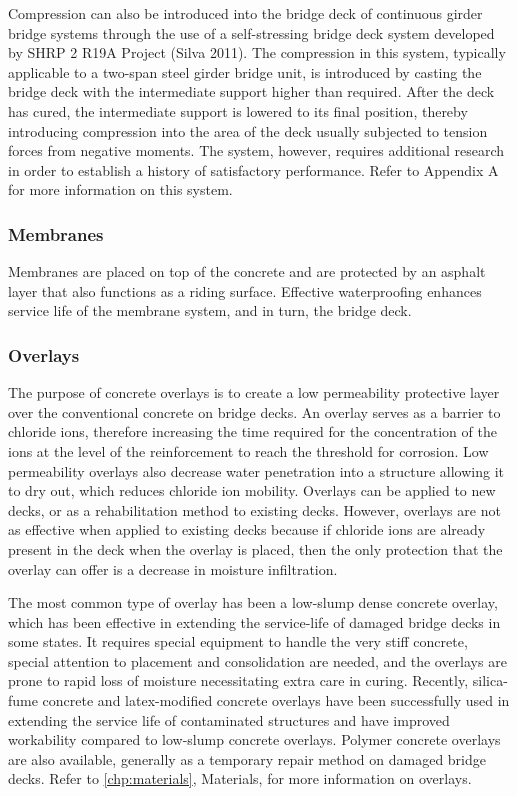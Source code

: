 Compression can also be introduced into the bridge deck of continuous girder bridge systems through the use of a
self-stressing bridge deck system developed by SHRP 2 R19A Project (Silva 2011). The compression in this system,
typically applicable to a two-span steel girder bridge unit, is introduced by casting the bridge deck with the
intermediate support higher than required. After the deck has cured, the intermediate support is lowered to its final
position, thereby introducing compression into the area of the deck usually subjected to tension forces from negative
moments. The system, however, requires additional research in order to establish a history of satisfactory
performance. Refer to Appendix A for more information on this system.

\subsubsection{Membranes}
Membranes are placed on top of the concrete and are protected by an asphalt layer that also functions as a riding
surface. Effective waterproofing enhances service life of the membrane system, and in turn, the bridge deck.

\subsubsection{Overlays}
The purpose of concrete overlays is to create a low permeability protective layer over the conventional concrete
on bridge decks. An overlay serves as a barrier to chloride ions, therefore increasing the time required for the
concentration of the ions at the level of the reinforcement to reach the threshold for corrosion. Low permeability
overlays also decrease water penetration into a structure allowing it to dry out, which reduces chloride ion mobility.
Overlays can be applied to new decks, or as a rehabilitation method to existing decks. However, overlays are not as
effective when applied to existing decks because if chloride ions are already present in the deck when the overlay is
placed, then the only protection that the overlay can offer is a decrease in moisture infiltration.

The most common type of overlay has been a low-slump dense concrete overlay, which has been effective in
extending the service-life of damaged bridge decks in some states. It requires special equipment to handle the very stiff concrete, special attention to placement and consolidation are needed, and the overlays are prone to rapid loss of
moisture necessitating extra care in curing. Recently, silica-fume concrete and latex-modified concrete overlays have
been successfully used in extending the service life of contaminated structures and have improved workability
compared to low-slump concrete overlays. Polymer concrete overlays are also available, generally as a temporary
repair method on damaged bridge decks. Refer to \cref{chp:materials}, Materials, for more information on overlays.

